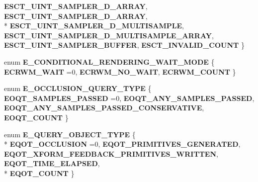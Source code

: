 \begin{DoxyCompactItemize}
{\bfseries E\+S\+C\+T\+\_\+\+U\+I\+N\+T\+\_\+\+S\+A\+M\+P\+L\+E\+R\+\_\+D\+\_\+\+A\+R\+R\+AY}, 
{\bfseries E\+S\+C\+T\+\_\+\+U\+I\+N\+T\+\_\+\+S\+A\+M\+P\+L\+E\+R\+\_\+D\+\_\+\+A\+R\+R\+AY}, 
\\*
{\bfseries E\+S\+C\+T\+\_\+\+U\+I\+N\+T\+\_\+\+S\+A\+M\+P\+L\+E\+R\+\_\+D\+\_\+\+M\+U\+L\+T\+I\+S\+A\+M\+P\+LE}, 
{\bfseries E\+S\+C\+T\+\_\+\+U\+I\+N\+T\+\_\+\+S\+A\+M\+P\+L\+E\+R\+\_\+D\+\_\+\+M\+U\+L\+T\+I\+S\+A\+M\+P\+L\+E\+\_\+\+A\+R\+R\+AY}, 
{\bfseries E\+S\+C\+T\+\_\+\+U\+I\+N\+T\+\_\+\+S\+A\+M\+P\+L\+E\+R\+\_\+\+B\+U\+F\+F\+ER}, 
{\bfseries E\+S\+C\+T\+\_\+\+I\+N\+V\+A\+L\+I\+D\+\_\+\+C\+O\+U\+NT}
 \}\hypertarget{namespaceirr_1_1video_a4e4613818408d794082fd9dcc6fa5c2b}{}\label{namespaceirr_1_1video_a4e4613818408d794082fd9dcc6fa5c2b}

\item 
enum {\bfseries E\+\_\+\+C\+O\+N\+D\+I\+T\+I\+O\+N\+A\+L\+\_\+\+R\+E\+N\+D\+E\+R\+I\+N\+G\+\_\+\+W\+A\+I\+T\+\_\+\+M\+O\+DE} \{ {\bfseries E\+C\+R\+W\+M\+\_\+\+W\+A\+IT} =0, 
{\bfseries E\+C\+R\+W\+M\+\_\+\+N\+O\+\_\+\+W\+A\+IT}, 
{\bfseries E\+C\+R\+W\+M\+\_\+\+C\+O\+U\+NT}
 \}\hypertarget{namespaceirr_1_1video_a9e8634a77765257dbeff07ad5c55ed95}{}\label{namespaceirr_1_1video_a9e8634a77765257dbeff07ad5c55ed95}

\item 
enum {\bfseries E\+\_\+\+O\+C\+C\+L\+U\+S\+I\+O\+N\+\_\+\+Q\+U\+E\+R\+Y\+\_\+\+T\+Y\+PE} \{ {\bfseries E\+O\+Q\+T\+\_\+\+S\+A\+M\+P\+L\+E\+S\+\_\+\+P\+A\+S\+S\+ED} =0, 
{\bfseries E\+O\+Q\+T\+\_\+\+A\+N\+Y\+\_\+\+S\+A\+M\+P\+L\+E\+S\+\_\+\+P\+A\+S\+S\+ED}, 
{\bfseries E\+O\+Q\+T\+\_\+\+A\+N\+Y\+\_\+\+S\+A\+M\+P\+L\+E\+S\+\_\+\+P\+A\+S\+S\+E\+D\+\_\+\+C\+O\+N\+S\+E\+R\+V\+A\+T\+I\+VE}, 
{\bfseries E\+O\+Q\+T\+\_\+\+C\+O\+U\+NT}
 \}\hypertarget{namespaceirr_1_1video_a76222d99cfee936d301faddde644c90f}{}\label{namespaceirr_1_1video_a76222d99cfee936d301faddde644c90f}

\item 
enum {\bfseries E\+\_\+\+Q\+U\+E\+R\+Y\+\_\+\+O\+B\+J\+E\+C\+T\+\_\+\+T\+Y\+PE} \{ \\*
{\bfseries E\+Q\+O\+T\+\_\+\+O\+C\+C\+L\+U\+S\+I\+ON} =0, 
{\bfseries E\+Q\+O\+T\+\_\+\+P\+R\+I\+M\+I\+T\+I\+V\+E\+S\+\_\+\+G\+E\+N\+E\+R\+A\+T\+ED}, 
{\bfseries E\+Q\+O\+T\+\_\+\+X\+F\+O\+R\+M\+\_\+\+F\+E\+E\+D\+B\+A\+C\+K\+\_\+\+P\+R\+I\+M\+I\+T\+I\+V\+E\+S\+\_\+\+W\+R\+I\+T\+T\+EN}, 
{\bfseries E\+Q\+O\+T\+\_\+\+T\+I\+M\+E\+\_\+\+E\+L\+A\+P\+S\+ED}, 
\\*
{\bfseries E\+Q\+O\+T\+\_\+\+C\+O\+U\+NT}
 \}\hypertarget{namespaceirr_1_1video_a853f1cfdc8c3dfc706225eb08909202e}{}\label{namespaceirr_1_1video_a853f1cfdc8c3dfc706225eb08909202e}


\end{DoxyCompactItemize}
